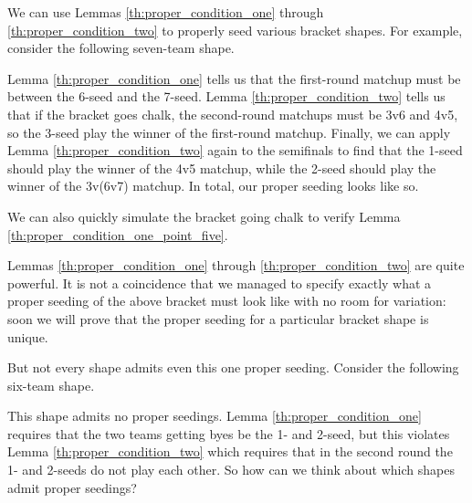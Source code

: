 {We can use Lemmas \ref{th:proper_condition_one} through \ref{th:proper_condition_two} to properly seed various bracket shapes. For example, consider the following seven-team shape.


Lemma \ref{th:proper_condition_one} tells us that the first-round matchup must be between the 6-seed and the 7-seed. Lemma \ref{th:proper_condition_two} tells us that if the bracket goes chalk, the second-round matchups must be 3v6 and 4v5, so the 3-seed play the winner of the first-round matchup. Finally, we can apply Lemma \ref{th:proper_condition_two} again to the semifinals to find that the 1-seed should play the winner of the 4v5 matchup, while the 2-seed should play the winner of the 3v(6v7) matchup. In total, our proper seeding looks like so.


We can also quickly simulate the bracket going chalk to verify Lemma \ref{th:proper_condition_one_point_five}.

Lemmas \ref{th:proper_condition_one} through \ref{th:proper_condition_two} are quite powerful. It is not a coincidence that we managed to specify exactly what a proper seeding of the above bracket must look like with no room for variation: soon we will prove that the proper seeding for a particular bracket shape is unique. 

But not every shape admits even this one proper seeding. Consider the following six-team shape.


This shape admits no proper seedings. Lemma \ref{th:proper_condition_one} requires that the two teams getting byes be the 1- and 2-seed, but this violates Lemma \ref{th:proper_condition_two} which requires that in the second round the 1- and 2-seeds do not play each other. So how can we think about which shapes admit proper seedings?

}
